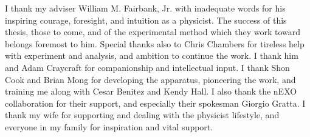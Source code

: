 \begin{acknowledgements}
I thank my adviser William M. Fairbank, Jr. with inadequate words for his inspiring courage, foresight, and intuition as a physicist.  The success of this thesis, those to come, and of the experimental method which they work toward belongs foremost to him.  Special thanks also to Chris Chambers for tireless help with experiment and analysis, and ambition to continue the work.  I thank him and Adam Craycraft for companionship and intellectual input.  I thank Shon Cook and Brian Mong for developing the apparatus, pioneering the work, and training me along with Cesar Benitez and Kendy Hall.  I also thank the nEXO collaboration for their support, and especially their spokesman Giorgio Gratta.  I thank my wife for supporting and dealing with the physicist lifestyle, and everyone in my family for inspiration and vital support.

\end{acknowledgements}